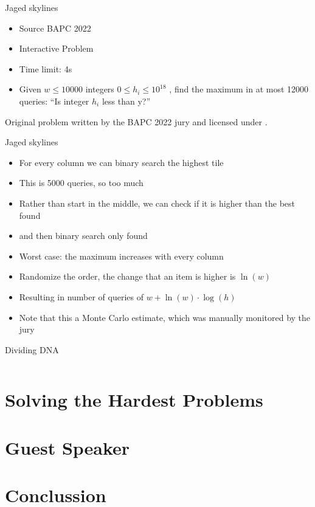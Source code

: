 \documentclass[11pt,pdf, aspectratio=169]{beamer}
\begin{document}
  \begin{frame}{Jaged skylines}
    \begin{itemize}
      \item Source BAPC 2022
      \item Interactive Problem
      \item Time limit: 4s
      \item  Given $w \leq 10000$ integers $0 \leq h_i \leq 10^{18}$ , find the maximum in at most 12000 queries: ``Is integer $h_i$ less than y?''
    \end{itemize}
    Original problem written by the BAPC 2022 jury and licensed under \doclicenseLongNameRef.

    \doclicenseImage
  \end{frame}
  \begin{frame}{Jaged skylines}
    \begin{itemize}
      \item For every column we can binary search the highest tile
      \item This is 5000 queries, so too much
      \item Rather than start in the middle, we can check if it is higher than the best found
      \item and then binary search only found
      \item Worst case: the maximum increases with every column
      \item Randomize the order, the change that an item is higher is $\ln(w)$
      \item Resulting in number of queries of $w+\ln(w)\cdot \log(h)$
      \item Note that this a Monte Carlo estimate, which was manually monitored by the jury
    \end{itemize}
  \end{frame}
  \begin{frame}[containsverbatim]{Dividing DNA}
    \inputminted{python}{code/session-4/bapc-j.py}
  \end{frame}


  \section{Solving the Hardest Problems}


  \section{Guest Speaker}


  \section{Conclussion}
\end{document}
